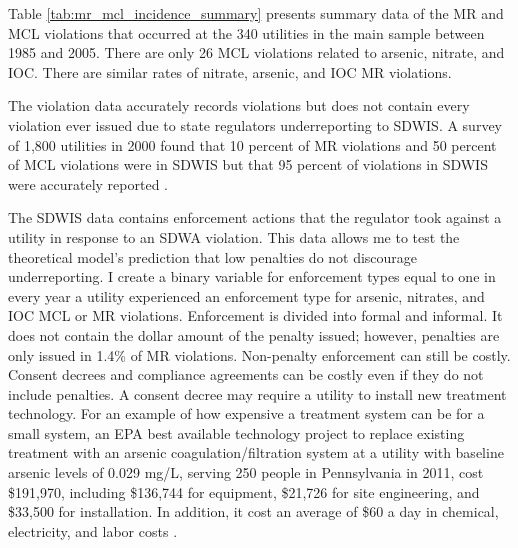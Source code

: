 \documentclass{article}
\begin{document}

Table \ref{tab:mr_mcl_incidence_summary} presents summary data of the MR and MCL violations that occurred at the 340 utilities in the main sample between 1985 and 2005. There are only 26 MCL violations related to arsenic, nitrate, and IOC. There are similar rates of nitrate, arsenic, and IOC MR violations.

The violation data accurately records violations but does not contain every violation ever issued due to state regulators underreporting to SDWIS. A survey of 1,800 utilities in 2000 found that 10 percent of MR violations and 50 percent of MCL violations were in SDWIS but that 95 percent of violations in SDWIS were accurately reported \parencite{epaviolationreliability}.

The SDWIS data contains enforcement actions that the regulator took against a utility in response to an SDWA violation. This data allows me to test the theoretical model's prediction that low penalties do not discourage underreporting. I create a binary variable for enforcement types equal to one in every year a utility experienced an enforcement type for arsenic, nitrates, and IOC MCL or MR violations. Enforcement is divided into formal and informal. It does not contain the dollar amount of the penalty issued; however, penalties are only issued in 1.4\% of MR violations. Non-penalty enforcement can still be costly. Consent decrees and compliance agreements can be costly even if they do not include penalties. A consent decree may require a utility to install new treatment technology. For an example of how expensive a treatment system can be for a small system, an EPA best available technology project to replace existing treatment with an arsenic coagulation/filtration system at a utility with baseline arsenic levels of 0.029 mg/L, serving 250 people in Pennsylvania in 2011, cost \$191,970, including \$136,744 for equipment, \$21,726 for site engineering, and \$33,500 for installation. In addition, it cost an average of \$60 a day in chemical, electricity, and labor costs \parencite{epaarsenicbat}.
\end{document}
